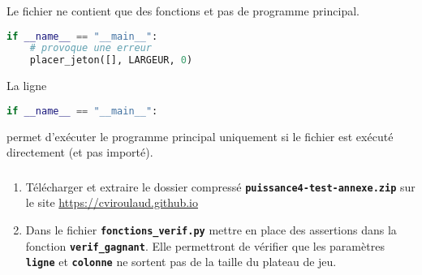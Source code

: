 \documentclass[svgnames,11pt]{beamer}
\begin{document}
\begin{frame}[fragile]
    \frametitle{}

    Le fichier ne contient que des fonctions et pas de programme principal.
    \begin{center}
        \begin{lstlisting}[language=Python , basicstyle=\ttfamily\small, xleftmargin=2em, xrightmargin=2em]
if __name__ == "__main__":
    # provoque une erreur
    placer_jeton([], LARGEUR, 0)
\end{lstlisting}
        \label{CODE}
    \end{center}
    \begin{aretenir}
        La ligne
        \begin{lstlisting}[language=Python , basicstyle=\ttfamily\small, xleftmargin=2em, xrightmargin=2em]
if __name__ == "__main__":
\end{lstlisting}
        permet d'exécuter le programme principal uniquement si le fichier est exécuté directement (et pas importé).
    \end{aretenir}
\end{frame}
\begin{frame}
    \frametitle{}

    \begin{activite}
        \begin{enumerate}
            \item Télécharger et extraire le dossier compressé \textbf{\texttt{puissance4-test-annexe.zip}} sur le site \url{https://cviroulaud.github.io}
            \item Dans le fichier \textbf{\texttt{fonctions\_verif.py}} mettre en place des assertions dans la fonction \textbf{\texttt{verif\_gagnant}}. Elle permettront de vérifier que les paramètres \textbf{\texttt{ligne}} et \textbf{\texttt{colonne}} ne sortent pas de la taille du plateau de jeu.
        \end{enumerate}

    \end{activite}

\end{frame}
\end{document}
